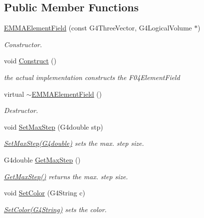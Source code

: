 \subsection*{Public Member Functions}
\begin{DoxyCompactItemize}
\item 
\hyperlink{classEMMAElementField_add98f76bf86d66edd4f94119c20e95e5}{E\+M\+M\+A\+Element\+Field} (const G4\+Three\+Vector, G4\+Logical\+Volume $\ast$)
\begin{DoxyCompactList}\small\item\em Constructor. \end{DoxyCompactList}\item 
void \hyperlink{classEMMAElementField_ac9fc590e35ae0a7a81253de6a3271379}{Construct} ()
\begin{DoxyCompactList}\small\item\em the actual implementation constructs the F04\+Element\+Field \end{DoxyCompactList}\item 
virtual \hyperlink{classEMMAElementField_afda9d839a3caadc03a68a603f8c64d1a}{$\sim$\+E\+M\+M\+A\+Element\+Field} ()
\begin{DoxyCompactList}\small\item\em Destructor. \end{DoxyCompactList}\item 
void \hyperlink{classEMMAElementField_ac77a8d456ddba267a86c37577b6d8237}{Set\+Max\+Step} (G4double stp)
\begin{DoxyCompactList}\small\item\em \hyperlink{classEMMAElementField_ac77a8d456ddba267a86c37577b6d8237}{Set\+Max\+Step(\+G4double)} sets the max. step size. \end{DoxyCompactList}\item 
G4double \hyperlink{classEMMAElementField_ad3dc48616b3869104b10dc1007b6c95e}{Get\+Max\+Step} ()
\begin{DoxyCompactList}\small\item\em \hyperlink{classEMMAElementField_ad3dc48616b3869104b10dc1007b6c95e}{Get\+Max\+Step()} returns the max. step size. \end{DoxyCompactList}\item 
void \hyperlink{classEMMAElementField_aa5c4c2ca091dd120a76a59ef790a6758}{Set\+Color} (G4\+String c)
\begin{DoxyCompactList}\small\item\em \hyperlink{classEMMAElementField_aa5c4c2ca091dd120a76a59ef790a6758}{Set\+Color(\+G4\+String)} sets the color. \end{DoxyCompactList}\item 

\end{DoxyCompactItemize}
